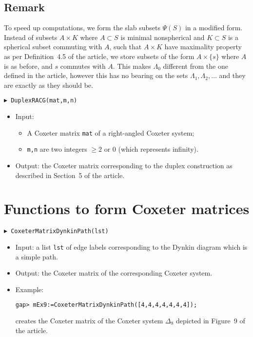 \documentclass[10pt]{amsart}
\begin{document}
\subsection*{Remark} To speed up computations, we form the slab subsets $\Psi(S)$ in a modified form. Instead of subsets $A\times K$ where $A\subset S$ is minimal nonspherical and $K\subset S$ is a spherical subset commuting with $A$, such that $A\times K$ have maximality property as per Definition~4.5 of the article, we store subsets of the form $A\times\{s\}$ where $A$ is as before, and $s$ commutes with $A$. This makes $\Lambda_0$ different from the one defined in the article, however this has no bearing on the sets $\Lambda_1,\Lambda_2,\dots$ and they are exactly as they should be.

\bigskip\noindent
{\tt $\blacktriangleright$ DuplexRACG(mat,m,n)}
\noindent 
\begin{itemize}
\item{} Input: 
	\begin{itemize}
	\item A Coxeter matrix {\tt mat} of a right-angled Coxeter system;
	\item {\tt m,n} are two integers $\ge 2$ or $0$ (which represents infinity).
	\end{itemize}
\item{} Output: the Coxeter matrix corresponding to the duplex construction as described in Section~5 of the article.
\end{itemize}



\section{Functions to form Coxeter matrices}

\noindent
{\tt $\blacktriangleright$ CoxeterMatrixDynkinPath(lst)}
\noindent 
\begin{itemize}
\item{} Input: a list {\tt lst} of edge labels corresponding to the Dynkin diagram which is a simple path.
\item{} Output: the Coxeter matrix of the corresponding Coxeter system.
\item Example: 

\noindent
\verb+gap> mEx9:=CoxeterMatrixDynkinPath([4,4,4,4,4,4,4]);+

\noindent
creates the Coxeter matrix of the Coxeter system $\Delta_8$ depicted in Figure~9 of the article.
\end{itemize}
\end{document}
